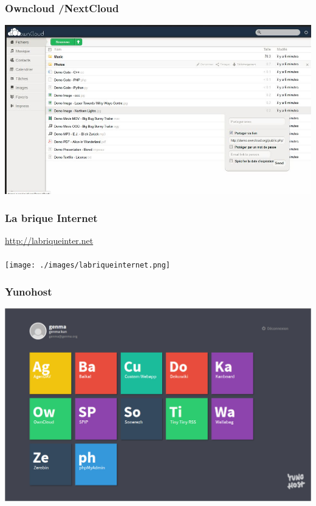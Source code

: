 \documentclass{beamer}
\begin{document}
\begin{frame}
\begin{center}
\frametitle{Owncloud /NextCloud}
\includegraphics[scale=0.6] {./images/owncloud.jpg}
\end{center}
\end{frame}
\begin{frame}
\begin{center}
\frametitle{La brique Internet}
\url{http://labriqueinter.net}
\\~\\
\texttt{[image: ./images/labriqueinternet.png]}
\end{center}
\end{frame}

\begin{frame}
\begin{center}
\frametitle{Yunohost}
\includegraphics[scale=0.25] {./images/Yunohost.jpg}
\end{center}
\end{frame}
\end{document}
